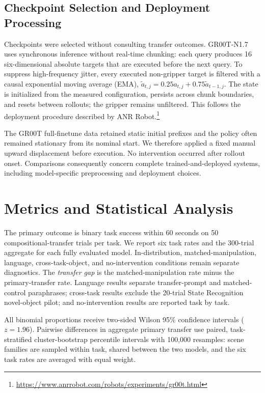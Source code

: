 \documentclass[conference]{IEEEtran}
\begin{document}
\subsection{Checkpoint Selection and Deployment Processing}

Checkpoints were selected without consulting transfer outcomes. GR00T-N1.7
uses synchronous inference without real-time chunking: each query produces
16 six-dimensional absolute targets that are executed before the next
query. To suppress high-frequency jitter, every executed non-gripper target
is filtered with a causal exponential moving average (EMA),
$\widetilde a_{t,j}=0.25a_{t,j}+0.75\widetilde a_{t-1,j}$. The state is
initialized from the measured configuration, persists across chunk
boundaries, and resets between rollouts; the gripper remains unfiltered.
This follows the deployment procedure described by ANR Robot.\footnote{\url{https://www.anrrobot.com/robots/experiments/gr00t.html}}

The GR00T full-finetune data retained static initial prefixes and the policy
often remained stationary from its nominal start. We therefore applied a
fixed manual upward displacement before execution. No intervention occurred
after rollout onset. Comparisons consequently concern complete trained-and-deployed
systems, including model-specific preprocessing and deployment choices.

\section{Metrics and Statistical Analysis}

The primary outcome is binary task success within 60 seconds on 50
compositional-transfer trials per task. We report six task rates and the
300-trial aggregate for each fully evaluated model. In-distribution,
matched-manipulation, language, cross-task-object, and no-intervention
conditions remain separate diagnostics. The \emph{transfer gap} is the
matched-manipulation rate minus the primary-transfer rate. Language results
separate transfer-prompt and matched-control paraphrases; cross-task results
exclude the 20-trial State Recognition novel-object pilot; and
no-intervention results are reported task by task.

All binomial proportions receive two-sided Wilson 95\% confidence intervals
($z=1.96$). Pairwise differences in aggregate primary transfer use paired,
task-stratified cluster-bootstrap percentile intervals with 100,000
resamples: scene families are sampled within task, shared between the two
models, and the six task rates are averaged with equal weight.
\end{document}

